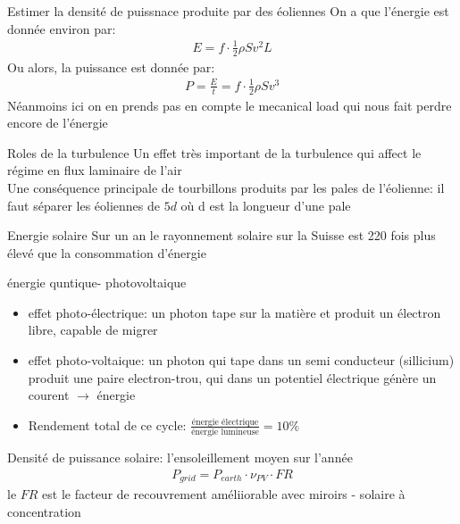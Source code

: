 \begin{parag}{Estimer la densité de puissnace produite par des éoliennes}
	On a que l'énergie est donnée environ par:
	\begin{align*} E = f \cdot  \frac{1}{2}\rho Sv^2L \end{align*}
	Ou alors, la puissance est donnée par:
	\begin{align*} P = \frac{E}{t} = f \cdot  \frac{1}{2}\rho Sv^3 \end{align*}
	Néanmoins ici on en prends pas en compte le mecanical load qui nous fait perdre encore de l'énergie\\
   \begin{subparag}{Roles de la turbulence}
       Un effet très important de la turbulence qui affect le régime en flux laminaire de l'air\\
       Une conséquence principale de tourbillons produits par les pales de l'éolienne: il faut séparer les éoliennes de $5d$ où d est la longueur d'une pale
   \end{subparag} 
\end{parag}
\begin{parag}{Energie solaire}
    Sur un an le rayonnement solaire sur la Suisse est 220 fois plus élevé que la consommation d'énergie
    \begin{subparag}{énergie quntique- photovoltaique}
        \begin{itemize}
		\item effet photo-électrique: un photon tape sur la matière et produit un électron libre, capable de migrer
		\item effet photo-voltaique: un photon qui tape dans un semi conducteur (sillicium) produit une paire electron-trou, qui dans un potentiel électrique génère un courent $\to$ énergie
		\item Rendement total de ce cycle: $\frac{\text{énergie électrique}}{\text{énergie lumineuse}} = 10\%$
        \end{itemize}
        
    \end{subparag}
\end{parag}
\begin{parag}{Densité de puissance solaire: l'ensoleillement moyen sur l'année}
    \begin{align*} P_{grid} = P_{earth} \cdot  \nu_{PV} \cdot  FR \end{align*}
    le $FR$ est le facteur de recouvrement améliiorable avec miroirs - solaire à concentration
\end{parag}
